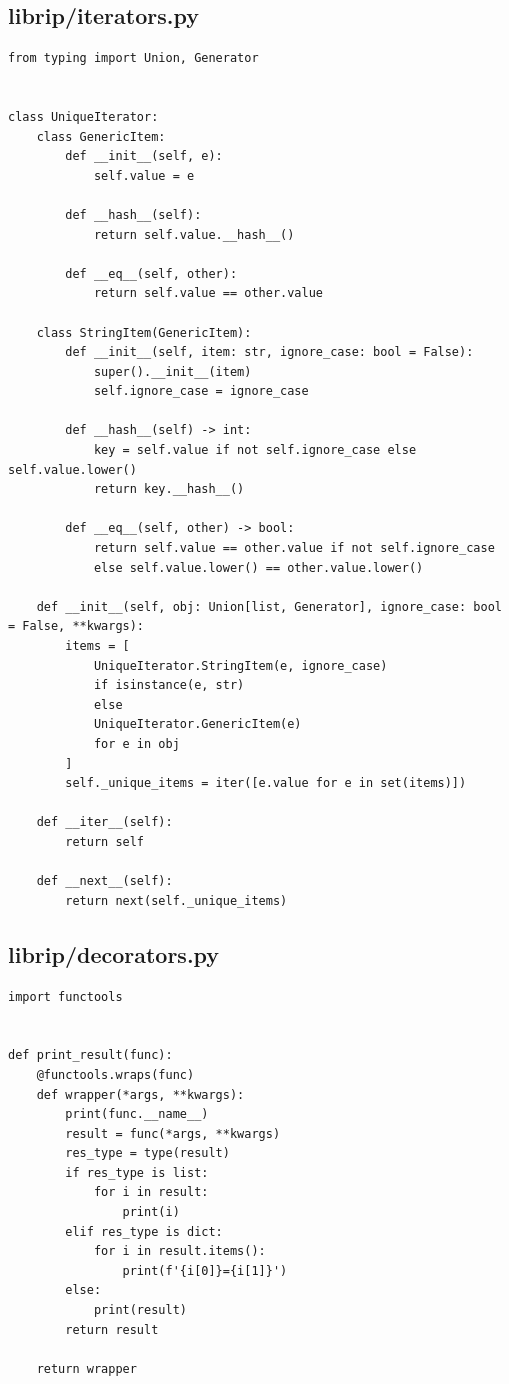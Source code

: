 \documentclass{article}
\begin{document}
\subsection{librip/iterators.py}
\begin{verbatim}
from typing import Union, Generator


class UniqueIterator:
    class GenericItem:
        def __init__(self, e):
            self.value = e
    
        def __hash__(self):
            return self.value.__hash__()

        def __eq__(self, other):
            return self.value == other.value
    
    class StringItem(GenericItem):
        def __init__(self, item: str, ignore_case: bool = False):
            super().__init__(item)
            self.ignore_case = ignore_case

        def __hash__(self) -> int:
            key = self.value if not self.ignore_case else self.value.lower()
            return key.__hash__()

        def __eq__(self, other) -> bool:
            return self.value == other.value if not self.ignore_case 
            else self.value.lower() == other.value.lower()

    def __init__(self, obj: Union[list, Generator], ignore_case: bool = False, **kwargs):
        items = [
            UniqueIterator.StringItem(e, ignore_case)
            if isinstance(e, str)
            else
            UniqueIterator.GenericItem(e)
            for e in obj
        ]
        self._unique_items = iter([e.value for e in set(items)])

    def __iter__(self):
        return self

    def __next__(self):
        return next(self._unique_items)

\end{verbatim}

\subsection{librip/decorators.py}
\begin{verbatim}
import functools


def print_result(func):
    @functools.wraps(func)
    def wrapper(*args, **kwargs):
        print(func.__name__)
        result = func(*args, **kwargs)
        res_type = type(result)
        if res_type is list:
            for i in result:
                print(i)
        elif res_type is dict:
            for i in result.items():
                print(f'{i[0]}={i[1]}')
        else:
            print(result)
        return result

    return wrapper

\end{verbatim}
\end{document}

